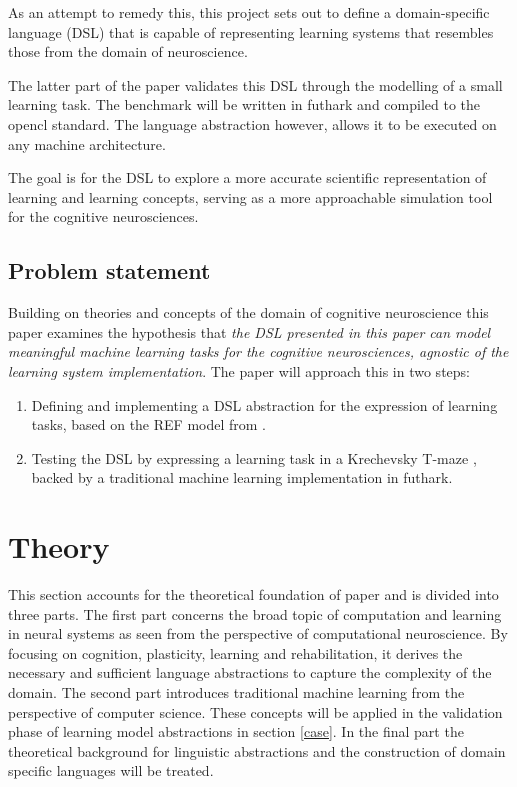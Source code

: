 \documentclass[a4paper,oneside]{memoir}
\begin{document}
As an attempt to remedy this, this project sets out to define a domain-specific
language (DSL) that is capable of representing learning systems that resembles
those from the domain of neuroscience.

The latter part of the paper validates this DSL through the modelling of a small
learning task. The benchmark will be written in \gls{futhark} and compiled to
the \gls{opencl} standard. The language abstraction however, allows it to be
executed on any machine architecture.

The goal is for the DSL to explore a more accurate scientific representation of
learning and learning concepts, serving as a more approachable simulation tool
for the cognitive neurosciences.

\section{Problem statement}
Building on theories and concepts of the domain of cognitive neuroscience
this paper examines the hypothesis that
\textit{
  the DSL presented in this paper can model meaningful machine learning
  tasks for the cognitive neurosciences,
  agnostic of the learning system implementation}.
The paper will approach this in two steps:

\begin{enumerate}
  \item Defining and implementing a DSL abstraction for the expression of
        learning tasks, based on the REF model from \autocite{Mogensen2011}.
  \item Testing the DSL by expressing a learning task in a Krechevsky
        T-maze \autocite{Krechevsky1932}, backed by a traditional machine
        learning implementation in \gls{futhark}.
\end{enumerate}
%

{\let\clearpage\relax\chapter{Theory}}
This section accounts for the theoretical foundation of paper and is divided
into three parts.
The first part concerns the broad topic of computation and learning in neural
systems as seen from the perspective of computational neuroscience. By focusing
on cognition, plasticity, learning and rehabilitation, it derives
the necessary and sufficient language abstractions to capture the complexity
of the domain.
The second part introduces traditional machine learning from the perspective of
computer science. These concepts will be applied in the validation phase of
learning model abstractions in section \ref{case}.
In the final part the theoretical background for linguistic abstractions and
the construction of domain specific languages will be treated.
\end{document}
